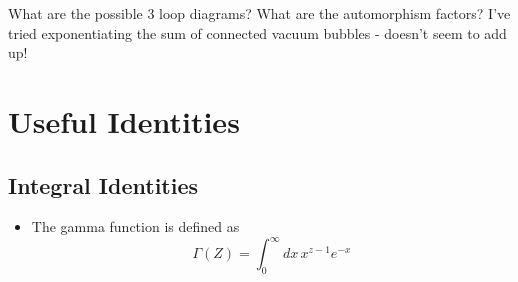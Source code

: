 \documentclass[11pt, oneside]{article}   	%
\theoremstyle{slanted}
\begin{document}
What are the possible 3 loop diagrams? 
What are the automorphism factors?
I've tried exponentiating 
the sum of connected vacuum bubbles  - doesn't 
seem to add up!


\section{Useful Identities}

\subsection{Integral Identities}
\begin{itemize}
	\item The gamma function is defined as 
		\[
		 \Gamma\left( Z   \right)  = \int_0^{ \infty} dx \, x ^{ z - 1 } e ^{ - x }
		\] 
\end{itemize}
\end{document}
